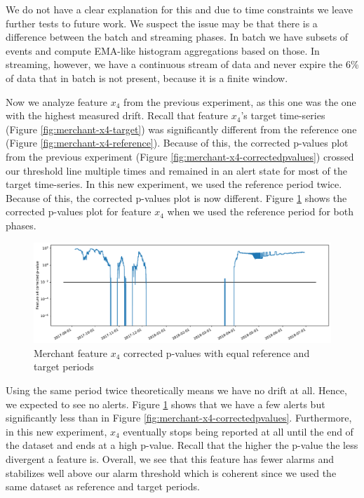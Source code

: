 We do not have a clear explanation for this and due to time constraints we leave further tests to future work. We suspect the issue may be that there is a difference between the batch and streaming phases. In batch we have subsets of events and compute EMA-like histogram aggregations based on those. In streaming, however, we have a continuous stream of data and never expire the 6\% of data that in batch is not present, because it is a finite window.

Now we analyze feature $x_4$ from the previous experiment, as this one was the one with the highest measured drift. Recall that feature $x_4$'s target time-series (Figure \ref{fig:merchant-x4-target}) was significantly different from the reference one (Figure \ref{fig:merchant-x4-reference}). Because of this, the corrected p-values plot from the previous experiment (Figure \ref{fig:merchant-x4-correctedpvalues}) crossed our threshold line multiple times and remained in an alert state for most of the target time-series. In this new experiment, we used the reference period twice. Because of this, the corrected p-values plot is now different. Figure \ref{fig:merchant2-x4-correctedpvalues} shows the corrected p-values plot for feature $x_4$ when we used the reference period for both phases.
\begin{figure}[!htb]
    \begin{center}
      \includegraphics[scale=0.5]{figures/merchant2-x4-correctedpvalues.pdf}
      \caption{Merchant feature $x_4$ corrected p-values with equal reference and target periods}
      \label{fig:merchant2-x4-correctedpvalues}
    \end{center}
\end{figure}
Using the same period twice theoretically means we have no drift at all. Hence, we expected to see no alerts. Figure \ref{fig:merchant2-x4-correctedpvalues} shows that we have a few alerts but significantly less than in Figure \ref{fig:merchant-x4-correctedpvalues}. Furthermore, in this new experiment, $x_4$ eventually stops being reported at all until the end of the dataset and ends at a high p-value. Recall that the higher the p-value the less divergent a feature is. Overall, we see that this feature has fewer alarms and stabilizes well above our alarm threshold which is coherent since we used the same dataset as reference and target periods.

